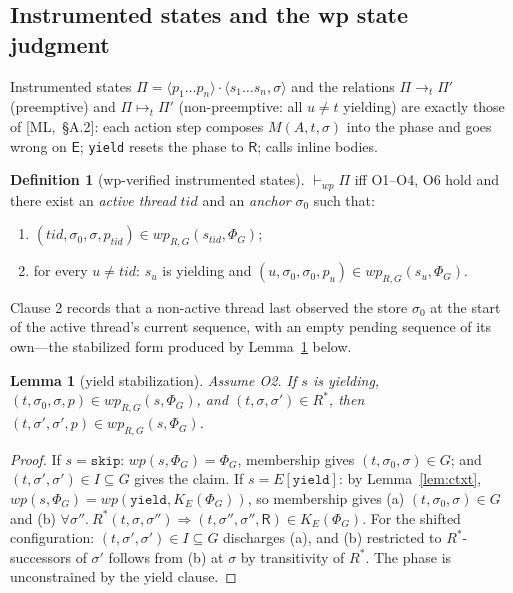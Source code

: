 \documentclass[11pt]{article}
\theoremstyle{plain}
\newtheorem{lemma}{Lemma}
\theoremstyle{plain}
\theoremstyle{definition}
\newtheorem{definition}{Definition}
\newcommand{\MR}{\mathsf{R}}
\newcommand{\ME}{\mathsf{E}}
\newcommand{\wpx}{\mathit{wp}}
\newcommand{\vdashwp}{\vdash_{\mathit{wp}}}
\newcommand{\tskip}{\mathtt{skip}}
\newcommand{\tyield}{\mathtt{yield}}
\newcommand{\code}[1]{\texttt{#1}}
\begin{document}
\subsection{Instrumented states and the wp state judgment}

Instrumented states
$\Pi = \langle p_1\ldots p_n\rangle\cdot\langle s_1\ldots s_n,\sigma\rangle$ and
the relations $\Pi\to_t\Pi'$ (preemptive) and $\Pi\mapsto_t\Pi'$ (non-preemptive:
all $u\neq t$ yielding) are exactly those of [ML,~\S A.2]: each action step
composes $M(A,t,\sigma)$ into the phase and goes wrong on $\ME$; \code{yield}
resets the phase to $\MR$; calls inline bodies.

\begin{definition}[wp-verified instrumented states]\label{def:istate}
$\vdashwp \Pi$ iff O1--O4, O6 hold and there exist an \emph{active thread}
$\mathit{tid}$ and an \emph{anchor} $\sigma_0$ such that:
\begin{enumerate}[leftmargin=2em]
\item $(\mathit{tid},\sigma_0,\sigma,p_{\mathit{tid}}) \in \wpx_{R,G}(s_{\mathit{tid}},\Phi_G)$;
\item for every $u\neq\mathit{tid}$: $s_u$ is yielding and
  $(u,\sigma_0,\sigma_0,p_u) \in \wpx_{R,G}(s_u,\Phi_G)$.
\end{enumerate}
\end{definition}

Clause 2 records that a non-active thread last observed the store $\sigma_0$ at the
start of the active thread's current sequence, with an empty pending sequence of
its own---the stabilized form produced by Lemma~\ref{lem:yield} below.

\begin{lemma}[yield stabilization]\label{lem:yield}
Assume O2. If $s$ is yielding, $(t,\sigma_0,\sigma,p)\in \wpx_{R,G}(s,\Phi_G)$, and
$(t,\sigma,\sigma')\in R^*$, then $(t,\sigma',\sigma',p)\in\wpx_{R,G}(s,\Phi_G)$.
\end{lemma}
\begin{proof}
If $s=\tskip$: $\wpx(s,\Phi_G)=\Phi_G$, membership gives $(t,\sigma_0,\sigma)\in G$;
and $(t,\sigma',\sigma')\in I\subseteq G$ gives the claim. If $s=E[\tyield]$: by
Lemma~\ref{lem:ctxt}, $\wpx(s,\Phi_G)=\wpx(\tyield,K_E(\Phi_G))$, so membership
gives (a) $(t,\sigma_0,\sigma)\in G$ and (b)
$\forall\sigma''.\ R^*(t,\sigma,\sigma'')\Rightarrow(t,\sigma'',\sigma'',\MR)\in K_E(\Phi_G)$.
For the shifted configuration: $(t,\sigma',\sigma')\in I\subseteq G$ discharges
(a), and (b) restricted to $R^*$-successors of $\sigma'$ follows from (b) at
$\sigma$ by transitivity of $R^*$. The phase is unconstrained by the yield clause.
\end{proof}
\end{document}
